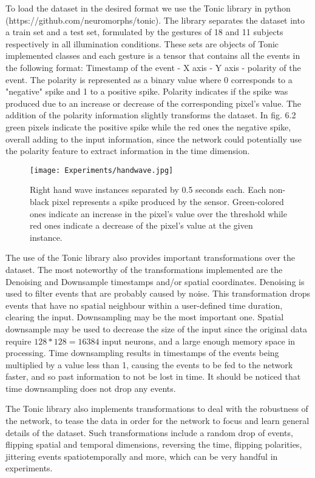 \documentclass[12pt]{report}
\begin{document}
To load the dataset in the desired format we use the Tonic library in python (https://github.com/neuromorphs/tonic). The library separates the dataset into a train set and a test set, formulated by the gestures of 18 and 11 subjects respectively in all illumination conditions. These sets are objects of Tonic implemented classes and each gesture is a tensor that contains all the events in the following format: Timestamp of the event - X axis - Y axis - polarity of the event. The polarity is represented as a binary value where 0 corresponds to a "negative" spike and 1 to a positive spike. Polarity indicates if the spike was produced due to an increase or decrease of the corresponding pixel's value. The addition of the polarity information slightly transforms the dataset. In fig. 6.2 green pixels indicate the positive spike while the red ones the negative spike, overall adding to the input information, since the network could potentially use the polarity feature to extract information in the time dimension. 

\begin{figure}[htp] %
    \centering
     \texttt{[image: Experiments/handwave.jpg]}
    \caption{Right hand wave instances separated by 0.5 seconds each. Each non-black pixel represents a spike produced by the sensor. Green-colored ones indicate an increase in the pixel's value over the threshold while red ones indicate a decrease of the pixel's value at the given instance.}
    \label{fig:representation-methods}
\end{figure}

The use of the Tonic library also provides important transformations over the dataset. The most noteworthy of the transformations implemented are the Denoising and Downsample timestamps and/or spatial coordinates. Denoising is used to filter events that are probably caused by noise. This transformation drops events that have no spatial neighbour within a user-defined time duration, clearing the input. Downsampling may be the most important one. Spatial downsample may be used to decrease the size of the input since the original data require \(128*128=16384\) input neurons, and a large enough memory space in processing. Time downsampling results in timestamps of the events being multiplied by a value less than 1, causing the events to be fed to the network faster, and so past information to not be lost in time. It should be noticed that time downsampling does not drop any events. 

The Tonic library also implements transformations to deal with the robustness of the network, to tease the data in order for the network to focus and learn general details of the dataset. Such transformations include a random drop of events, flipping spatial and temporal dimensions, reversing the time, flipping polarities, jittering events spatiotemporally and more, which can be very handful in experiments.
\end{document}
